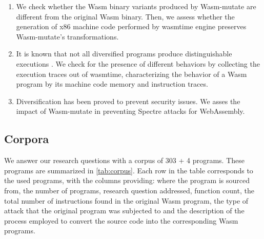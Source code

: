\documentclass[sigplan,screen]{acmart}
\newcommand{\tool}{Wasm-mutate\xspace}
\newcommand{\wasm}{Wasm\xspace}
\newcommand{\Wasm}{WebAssembly\xspace}
\begin{document}
\newcommand{\nProgramsRosetta}{303\xspace}


\newcommand{\DTWStatic}{\ensuremath{\mathit{dt\_static}\xspace}}
\newcommand{\DTWDynamic}{\ensuremath{\mathit{dt\_dy}\xspace}}

\begin{enumerate}[label=RQ\arabic*:, ref=RQ\arabic*]
     \item \label{rq:static} \textbf{\rqstatic}
        We  check whether the \wasm binary variants produced by \tool are different from the original \wasm binary. Then, we assess whether the generation of x86 machine code performed by wasmtime engine preserves \tool's transformations.
    
    \item \label{rq:dynamic}\textbf{\rqdynamic} 
        It is known that not all diversified programs produce distinguishable executions \cite{crane2015thwarting}. 
        We check for the presence of different behaviors by collecting the execution traces out of wasmtime, characterizing the behavior of a \wasm program by its machine code memory and instruction traces.
        
    \item \label{rq:defensive}\textbf{\rqdefensive} 
     \label{rq:performance} Diversification has been proved to prevent security issues. We asses the impact of \tool in preventing Spectre attacks for \Wasm.
    
    
\end{enumerate}

\subsection{Corpora}
\label{sec:corpus}



We answer our research questions with a corpus of 303 + 4 programs.
These programs are summarized in \autoref{tab:corpus}.
Each row in the table corresponds to the used programs, with the columns providing: where the program is sourced from, the number of programs, research question addressed, function count, the total number of instructions found in the original \wasm program, the type of attack that the original program was subjected to and the description of the process employed to convert the source code into the corresponding \wasm programs.
\end{document}
